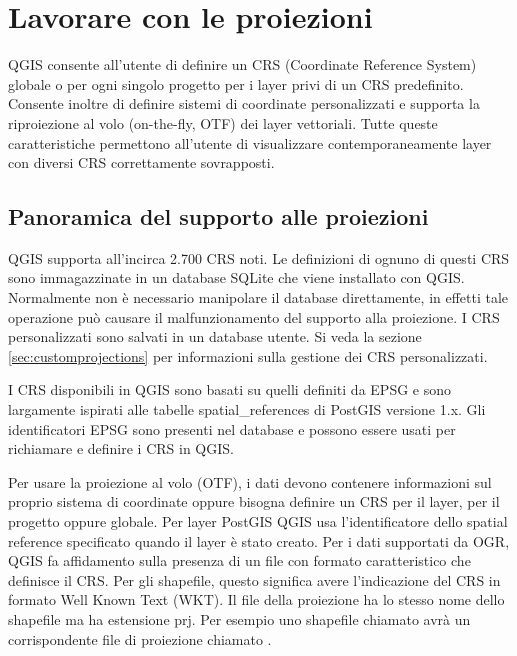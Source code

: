 
\section{Lavorare con le proiezioni}\label{label_projections}


QGIS consente all'utente di definire un CRS (Coordinate
Reference System) globale o per ogni singolo progetto per i layer privi di un
CRS predefinito. Consente inoltre di definire sistemi di coordinate
personalizzati e supporta la riproiezione al volo (on-the-fly, OTF) dei layer
vettoriali. Tutte queste caratteristiche permettono all'utente di visualizzare
contemporaneamente layer con diversi CRS correttamente sovrapposti.

\subsection{Panoramica del supporto alle proiezioni}\label{label_projoverview}

QGIS supporta all'incirca 2.700 CRS noti. Le definizioni di ognuno di questi
CRS sono immagazzinate in un database SQLite che viene installato con QGIS.
Normalmente non è necessario manipolare il database direttamente, in effetti
tale operazione può causare il malfunzionamento del supporto alla proiezione.
I CRS personalizzati sono salvati in un database utente.
Si veda la sezione \ref{sec:customprojections} per informazioni
sulla gestione dei CRS personalizzati.

I CRS disponibili in QGIS sono basati su quelli definiti da EPSG
e sono largamente ispirati alle tabelle spatial\_references
di PostGIS versione 1.x. Gli identificatori EPSG sono presenti
nel database e possono essere usati per richiamare e definire i CRS in QGIS.

Per usare la proiezione al volo (OTF), i dati devono contenere informazioni
sul proprio sistema di coordinate oppure bisogna definire un CRS per il layer,
per il progetto oppure globale.
Per layer PostGIS QGIS usa l'identificatore dello spatial reference
specificato quando il layer è stato creato. Per i dati supportati da OGR,
QGIS fa affidamento sulla presenza di un file con formato caratteristico che
definisce il CRS. Per gli shapefile, questo significa avere l'indicazione del
CRS in formato Well Known Text (WKT). Il file della proiezione
ha lo stesso nome dello shapefile ma ha estensione prj. Per esempio uno
shapefile chiamato  avrà un corrispondente file di
proiezione chiamato .

